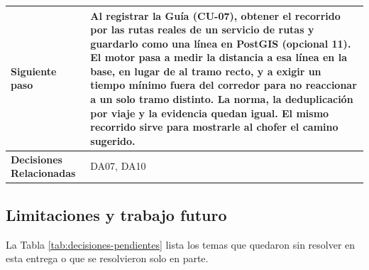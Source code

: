 \begin{table}[H]
\begin{tabular}{|p{4.1cm}|p{11.7cm}|}
        \hline
            \textbf{Siguiente paso} & Al registrar la Guía (CU-07), obtener el recorrido por las rutas reales de un servicio de rutas y guardarlo como una línea en PostGIS (opcional 11). El motor pasa a medir la distancia a esa línea en la base, en lugar de al tramo recto, y a exigir un tiempo mínimo fuera del corredor para no reaccionar a un solo tramo distinto. La norma, la deduplicación por viaje y la evidencia quedan igual. El mismo recorrido sirve para mostrarle al chofer el camino sugerido. \\
        \hline
            \textbf{Decisiones Relacionadas} & DA07, DA10 \\
        \hline
    \end{tabular}
\end{table}

\subsection{Limitaciones y trabajo futuro}

La Tabla \ref{tab:decisiones-pendientes} lista los temas que quedaron sin resolver en esta entrega o que se resolvieron solo en parte.

